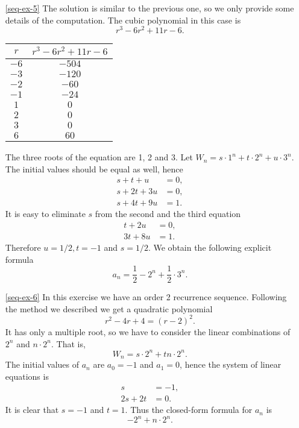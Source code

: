 \begin{enumerate}
\item[\ref{seq-ex-5}]
The solution is similar to the previous one, so we only provide some details of the computation.
The cubic polynomial in this case is
$$
r^3-6r^2+11r-6.
$$
\begin{center}
\begin{tabular}{|c|c|}
\hline
$r$ & $r^3-6r^2+11r-6$\\
\hline
$-6$ & $-504$\\
\hline
$-3$ & $-120$\\
\hline
$-2$ & $-60$\\
\hline
$-1$ & $-24$\\
\hline
$ 1$ & $0$\\
\hline
$ 2$ & $0$\\
\hline
$ 3$ & $0$\\
\hline
$ 6$ & $60$\\
\hline
\end{tabular}
\end{center}
The three roots of the equation are 1, 2 and 3. Let $W_n=s\cdot 1^n+t\cdot 2^n+u\cdot 3^n$.
The initial values should be equal as well, hence
\begin{align*}
s+t+u&=0,\\
s+2t+3u&=0,\\
s+4t+9u&=1.
\end{align*}
It is easy to eliminate $s$ from the second and the third equation
\begin{align*}
t+2u&=0,\\
3t+8u&=1.
\end{align*}
Therefore $u=1/2, t=-1$ and $s=1/2$. We obtain the following explicit formula
$$
a_n=\frac{1}{2}-2^n+\frac{1}{2}\cdot 3^n.
$$

\item[\ref{seq-ex-6}]
In this exercise we have an order 2 recurrence sequence. Following the method we described 
we get a quadratic polynomial
$$
r^2-4r+4=(r-2)^2.
$$
It has only a multiple root, so we have to consider the linear combinations of $2^n$ and $n\cdot 2^n$.
That is, 
$$
W_n=s\cdot 2^n+tn\cdot 2^n.
$$
The initial values of $a_n$ are $a_0=-1$ and $a_1=0$, hence the system of linear equations is
\begin{align*}
s&=-1,\\
2s+2t&=0.
\end{align*}
It is clear that $s=-1$ and $t=1$. Thus the closed-form formula for $a_n$ is
$$
-2^n+n\cdot 2^n.
$$


\end{enumerate}
